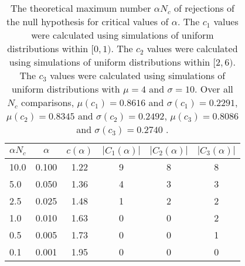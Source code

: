 \begin{table}[h!]
\begin{center}
\begin{tabular}{| l | c | c | c | c | c |}\hline
$\alpha N_c$ & $\alpha$ & $c(\alpha)$ & $|C_1(\alpha)|$ & $|C_2(\alpha)|$ & $|C_3(\alpha)|$ \\\hline\hline
10.0 & 0.100 & 1.22 & 9 & 8 & 8 \\\hline
5.0 & 0.050 & 1.36 & 4 & 3 & 3 \\\hline
2.5 & 0.025 & 1.48 & 1 & 2 & 2 \\\hline
1.0 & 0.010 & 1.63 & 0 & 0 & 2 \\\hline
0.5 & 0.005 & 1.73 & 0 & 0 & 1 \\\hline
0.1 & 0.001 & 1.95 & 0 & 0 & 0 \\\hline
\end{tabular}
\caption{The theoretical maximum number $\alpha N_c$ of rejections
of the null hypothesis for critical values of $\alpha$.
The $c_1$ values were calculated using simulations of uniform distributions within $[0,1)$.
The $c_2$ values were calculated using simulations of uniform distributions within $[2,6)$.
The $c_3$ values were calculated using simulations of uniform distributions with $\mu=4$ and $\sigma=10$.
Over all $N_c$ comparisons,
 $\mu(c_1)=0.8616$ and $\sigma(c_1)=0.2291$,
 $\mu(c_2)=0.8345$ and $\sigma(c_2)=0.2492$,
 $\mu(c_3)=0.8086$ and $\sigma(c_3)=0.2740$ .
}
\end{center}
\end{table}